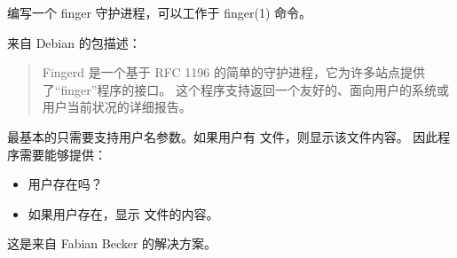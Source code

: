 \begin{Exercise}[title={*Finger 守护进程},difficulty=1]
\label{ex:finger}
\Question
编写一个 finger 守护进程，可以工作于 finger(1) 命令。

来自 Debian 的包描述：
\begin{quote}
Fingerd 是一个基于 RFC 1196 \cite{RFC1196} 的简单的守护进程，它为许多站点提供了``finger''程序的接口。
这个程序支持返回一个友好的、面向用户的系统或用户当前状况的详细报告。
\end{quote}

最基本的只需要支持用户名参数。如果用户有  
文件，则显示该文件内容。
因此程序需要能够提供：
\begin{itemize}
\item 用户存在吗？
\item 如果用户存在，显示  文件的内容。
\end{itemize}
\end{Exercise}

\begin{Answer}
\begin{lbar}
这是来自 Fabian Becker 的解决方案。
\end{lbar}
\Question

\end{Answer}
